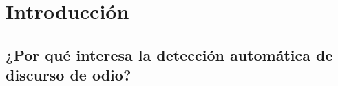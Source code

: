 \documentclass[11pt,a4paper,twoside]{tesis}
\begin{document}

\def\autor{Juan Manuel Pérez}
\def\tituloTesis{Técnicas y recursos para la detección automática de lenguaje discriminatorio en redes sociales}
\def\runtitulo{Técnicas y recursos para la detección automática de lenguaje discriminatorio en redes sociales}
\def\runtitle{Techniques and resources for the automatic detection of hate speech in social networks}
\def\director{Franco Luque}
\def\codirector{Agustín Gravano}
\def\lugarTrabajo{\makecell{
Departamento de Computación \\
Facultad de Cs. Exactas y Naturales \\
Universidad de Buenos Aires}}

\def\lugar{Buenos Aires, 2021}


%
\frontmatter
\pagestyle{empty}

%
\cleardoublepage

%
\cleardoublepage
%
\cleardoublepage
%
\cleardoublepage
\tableofcontents
%
\mainmatter
\pagestyle{headings}
%
%
%

\newcommand{\tbf}[1]{\textbf{#1}}
\newcommand{\mbf}[1]{\mathbf{#1}}

\newcommand{\bert}[0]{\emph{BERT}}
\newcommand{\ulmfit}[0]{\emph{ULM-FIT}}
\newcommand{\beto}[0]{\emph{BETO}}
\newcommand{\roberta}[0]{\emph{RoBERTa}}
\newcommand{\robertuito}[0]{\emph{RoBERTuito}}
\newcommand{\bertweet}[0]{\emph{BERTweet}}

\newcommand{\twitter}[0]{\emph{Twitter}}

\newcommand{\elmo}[0]{ELMo}
\newcommand{\hateval}[0]{\emph{HatEval}}
\newcommand{\softmax}[0]{\text{softmax}}
\newcommand{\semeval}[0]{SemEval-2019}


\newcommand{\fasttext}[0]{\emph{fastText}}

\newcommand{\mr}[2]{\multirow{#1}{*}{#2}}
\newcommand{\mc}[2]{\multicolumn{#1}{c}{#2}}
\newcommand{\thline}[1]{\Xhline{#1\arrayrulewidth}}


\newcommand{\tred}[1]{\textcolor{red}{#1}}


\part{Introducción}
\chapter{¿Por qué interesa la detección automática de discurso de odio?}

%
\end{document}
